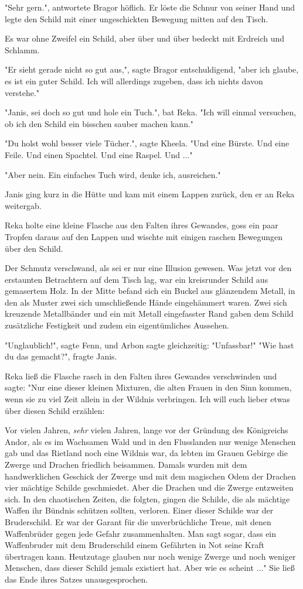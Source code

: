 \documentclass[10pt, a4paper, oneside]{book}
\begin{document}
\begin{multicols}{2}
"Sehr gern.", antwortete Bragor höflich. Er löste die Schnur von seiner Hand und legte den Schild mit einer ungeschickten Bewegung mitten auf den Tisch. 

Es war ohne Zweifel ein Schild, aber über und über bedeckt mit Erdreich und Schlamm. 

"Er sieht gerade nicht so gut aus,", sagte Bragor entschuldigend, "aber ich glaube, es ist ein guter Schild. Ich will allerdings zugeben, dass ich nichts davon verstehe." 

"Janis, sei doch so gut und hole ein Tuch.", bat Reka. "Ich will einmal versuchen, ob ich den Schild ein bisschen sauber machen kann." 

"Du holst wohl besser viele Tücher.", sagte Kheela. "Und eine Bürste. Und eine Feile. Und einen Spachtel. Und eine Raspel. Und ..." 

"Aber nein. Ein einfaches Tuch wird, denke ich, ausreichen." 

Janis ging kurz in die Hütte und kam mit einem Lappen zurück, den er an Reka weitergab. 

Reka holte eine kleine Flasche aus den Falten ihres Gewandes, goss ein paar Tropfen daraus auf den Lappen und wischte mit einigen raschen Bewegungen über den Schild. 

Der Schmutz verschwand, als sei er nur eine Illusion gewesen. Was jetzt vor den erstaunten Betrachtern auf dem Tisch lag, war ein kreisrunder Schild aus gemasertem Holz. In der Mitte befand sich ein Buckel aus glänzendem Metall, in den als Muster zwei sich umschließende Hände eingehämmert waren. Zwei sich kreuzende Metallbänder und ein mit Metall eingefasster Rand gaben dem Schild zusätzliche Festigkeit und zudem ein eigentümliches Aussehen. 

"Unglaublich!", sagte Fenn, und Arbon sagte gleichzeitig: "Unfassbar!" "Wie hast du das gemacht?", fragte Janis. 

Reka ließ die Flasche rasch in den Falten ihres Gewandes verschwinden und sagte: "Nur eine dieser kleinen Mixturen, die alten Frauen in den Sinn kommen, wenn sie zu viel Zeit allein in der Wildnis verbringen. Ich will euch lieber etwas über diesen Schild erzählen: 

Vor vielen Jahren, \textit{sehr} vielen Jahren, lange vor der Gründung des Königreichs Andor, als es im Wachsamen Wald und in den Flusslanden nur wenige Menschen gab und das Rietland noch eine Wildnis war, da lebten im Grauen Gebirge die Zwerge und Drachen friedlich beisammen. Damals wurden mit dem handwerklichen Geschick der Zwerge und mit dem magischen Odem der Drachen vier mächtige Schilde geschmiedet. Aber die Drachen und die Zwerge entzweiten sich. In den chaotischen Zeiten, die folgten, gingen die Schilde, die als mächtige Waffen ihr Bündnis schützen sollten, verloren. Einer dieser Schilde war der Bruderschild. Er war der Garant für die unverbrüchliche Treue, mit denen Waffenbrüder gegen jede Gefahr zusammenhalten. Man sagt sogar, dass ein Waffenbruder mit dem Bruderschild einem Gefährten in Not seine Kraft übertragen kann. Heutzutage glauben nur noch wenige Zwerge und noch weniger Menschen, dass dieser Schild jemals existiert hat. Aber wie es scheint ..." Sie ließ das Ende ihres Satzes unausgesprochen. 


\end{multicols}
\end{document}
